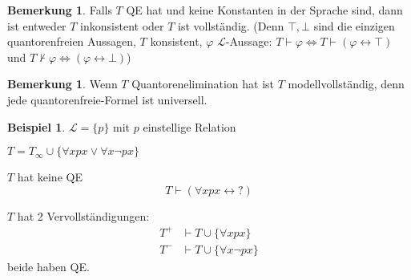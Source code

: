 \documentclass[12pt,parskip=full]{scrartcl}
\theoremstyle{definition}
\newtheorem{example}[theorem]{Beispiel}
\newtheorem{remark}[theorem]{Bemerkung}
\begin{document}
	\begin{remark}
		Falls $T$ QE hat und keine Konstanten in der Sprache sind, dann ist entweder $T$ inkonsistent oder $T$ ist vollständig. (Denn $\top, \bot$ sind die einzigen quantorenfreien Aussagen, $T$ konsistent, $\varphi$ $\mathcal{L}$-Aussage: $T \vdash \varphi \Leftrightarrow T \vdash (\varphi \leftrightarrow \top)$ und $T \not\vdash \varphi \Leftrightarrow (\varphi \leftrightarrow \bot)$)
	\end{remark}

	\begin{remark}
		Wenn $T$ Quantorenelimination hat ist $T$ modellvollständig, denn jede quantorenfreie-Formel ist universell.
	\end{remark}

	\begin{example}
		$\mathcal{L} = \{ p \}$ mit $p$ einstellige Relation
		
		$T = T_\infty \cup \{ \forall x p x \lor \forall x \lnot p x \}$
		
		$T$ hat keine QE
		\begin{equation*}
			T \vdash (\forall x px \leftrightarrow ?)
		\end{equation*}
		
		$T$ hat 2 Vervollständigungen:
		\begin{align*}
			T^+ &\vdash T \cup \{ \forall x p x \} \\
			T^- &\vdash T \cup \{ \forall x \lnot p x \}
		\end{align*}
		beide haben QE.
	\end{example}
	
\end{document}
